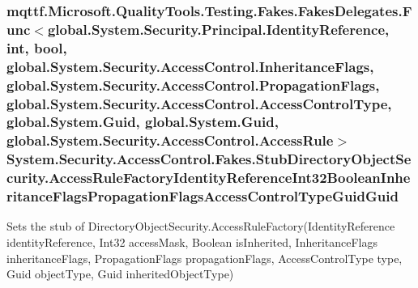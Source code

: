 \hypertarget{class_system_1_1_security_1_1_access_control_1_1_fakes_1_1_stub_directory_object_security_ab7ad414acc0f6840d9716e7006240e7d}{
\subsubsection[{Access\-Rule\-Factory\-Identity\-Reference\-Int32\-Boolean\-Inheritance\-Flags\-Propagation\-Flags\-Access\-Control\-Type\-Guid\-Guid}]{\setlength{\rightskip}{0pt plus 5cm}mqttf.\-Microsoft.\-Quality\-Tools.\-Testing.\-Fakes.\-Fakes\-Delegates.\-Func$<$global.\-System.\-Security.\-Principal.\-Identity\-Reference, int, bool, global.\-System.\-Security.\-Access\-Control.\-Inheritance\-Flags, global.\-System.\-Security.\-Access\-Control.\-Propagation\-Flags, global.\-System.\-Security.\-Access\-Control.\-Access\-Control\-Type, global.\-System.\-Guid, global.\-System.\-Guid, global.\-System.\-Security.\-Access\-Control.\-Access\-Rule$>$ System.\-Security.\-Access\-Control.\-Fakes.\-Stub\-Directory\-Object\-Security.\-Access\-Rule\-Factory\-Identity\-Reference\-Int32\-Boolean\-Inheritance\-Flags\-Propagation\-Flags\-Access\-Control\-Type\-Guid\-Guid}}\label{class_system_1_1_security_1_1_access_control_1_1_fakes_1_1_stub_directory_object_security_ab7ad414acc0f6840d9716e7006240e7d}


Sets the stub of Directory\-Object\-Security.\-Access\-Rule\-Factory(\-Identity\-Reference identity\-Reference, Int32 access\-Mask, Boolean is\-Inherited, Inheritance\-Flags inheritance\-Flags, Propagation\-Flags propagation\-Flags, Access\-Control\-Type type, Guid object\-Type, Guid inherited\-Object\-Type)

